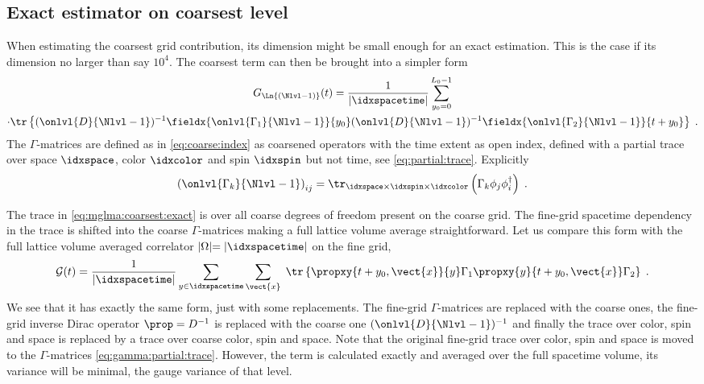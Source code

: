 \subsection{Exact estimator on coarsest level}
\label{sec:mglma:coarsest:exact}

When estimating the coarsest grid contribution, its dimension might be small enough for an exact estimation.
This is the case if its dimension no larger than say $10^{4}$.
The coarsest term can then be brought into a simpler form
\begin{multline} \label{eq:mglma:coarsest:exact}
G_{\Ln{(\Nlvl-1)}}(t)
= \frac{1}{\lvert \idxspacetime \rvert} \sum_{y_0=0}^{L_0-1} \\
\cdot \tr \left\{
  (\onlvl{D}{\Nlvl-1})^{-1}
  \fieldx{\onlvl{\Gamma_1}{\Nlvl-1}}{y_0}
  (\onlvl{D}{\Nlvl-1})^{-1}
  \fieldx{\onlvl{\Gamma_2}{\Nlvl-1}}{t+y_0}
\right\} \;.
\end{multline}
The $\Gamma$-matrices are defined as in \cref{eq:coarse:index} as coarsened operators with the time extent as open index, \ie defined with a partial trace over space $\idxspace$, color $\idxcolor$ and spin $\idxspin$ but not time, see \cref{eq:partial:trace}.
Explicitly
\begin{equation} \label{eq:gamma:partial:trace}
\left( \onlvl{\Gamma_k}{\Nlvl-1} \right)_{ij} = \tr_{\idxspace \times \idxspin \times \idxcolor} \left( \Gamma_k \phi_j \phi_i^\dagger \right) \;.
\end{equation}

The trace in \cref{eq:mglma:coarsest:exact} is over all coarse degrees of freedom present on the coarse grid.
The fine-grid spacetime dependency in the trace is shifted into the coarse $\Gamma$-matrices making a full lattice volume average straightforward.
Let us compare this form with the full lattice volume averaged correlator $\lvert \Omega \lvert = \lvert \idxspacetime \lvert$ on the fine grid,
\begin{equation} \label{eq:G:corr:volume:averaged}
\mathcal{G}(t) =
\frac{1}{\lvert \idxspacetime \rvert}
\sum_{y \in \idxspacetime}
\sum_{\vect{x}} \;
\tr \left\{
  \propxy{t+y_0, \vect{x}}{y} \Gamma_1 \propxy{y}{t+y_0, \vect{x}} \Gamma_2
\right\} \;.
\end{equation}
We see that it has exactly the same form, just with some replacements.
The fine-grid $\Gamma$-matrices are replaced with the coarse ones, the fine-grid inverse Dirac operator $\prop=D^{-1}$ is replaced with the coarse one $(\onlvl{D}{\Nlvl-1})^{-1}$ and finally the trace over color, spin and space is replaced by a trace over coarse color, spin and space.
Note that the original fine-grid trace over color, spin and space is moved to the $\Gamma$-matrices \cref{eq:gamma:partial:trace}.
However, the term is calculated exactly and averaged over the full spacetime volume, its variance will be minimal, \ie the gauge variance of that level.

